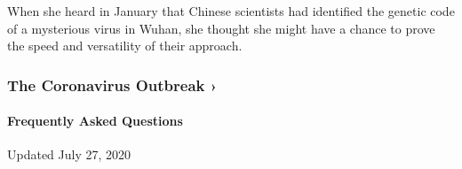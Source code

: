 When she heard in January that Chinese scientists had identified the
genetic code of a mysterious virus in Wuhan, she thought she might have
a chance to prove the speed and versatility of their approach.

\href{https://www.nytimes.com/news-event/coronavirus?action=click\&pgtype=Article\&state=default\&region=MAIN_CONTENT_3\&context=storylines_faq}{}

\hypertarget{the-coronavirus-outbreak-}{%
\subsubsection{The Coronavirus Outbreak
›}\label{the-coronavirus-outbreak-}}

\hypertarget{frequently-asked-questions}{%
\paragraph{Frequently Asked
Questions}\label{frequently-asked-questions}}

Updated July 27, 2020

